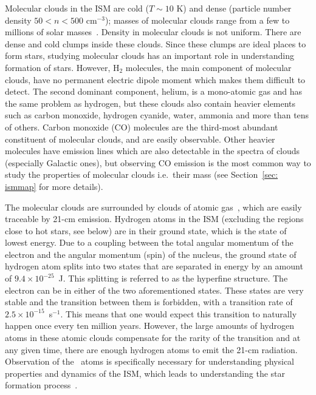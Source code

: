 Molecular clouds in the ISM are cold ($T \sim10$ K) and dense (particle number density $ 50<n<500$ cm$^{-3}$); masses of molecular clouds range from a few to millions of solar masses~\citep{Bolato08}.
Density in molecular clouds is not uniform. There are dense and cold clumps inside these clouds.
Since these clumps are ideal places to form stars, studying molecular clouds has an important role in understanding formation of stars.
However, H$_2$ molecules, the main component of molecular clouds, have no permanent electric dipole moment which makes them difficult to detect.
The second dominant component, helium, is a mono-atomic gas and has the same problem as hydrogen, but these clouds also contain heavier elements such as carbon monoxide, hydrogen cyanide, water, ammonia and more than tens of others.
Carbon monoxide (CO) molecules are the third-most abundant constituent of molecular clouds, and are easily observable.
Other heavier molecules have emission lines which are also detectable in the spectra of clouds (especially Galactic ones), but observing CO emission is the most common way to study the properties of molecular clouds i.e.\ their mass (see Section~\ref{sec: ismmap} for more details).

The molecular clouds are surrounded by clouds of atomic gas~\citep{Kennicutt12}, which are easily traceable by 21-cm emission.
Hydrogen atoms in the ISM (excluding the regions close to hot stars, see below) are in their ground state, which is the state of lowest energy.
Due to a coupling between the total angular momentum of the electron and the angular momentum (spin) of the nucleus, the ground state of hydrogen atom splits into two states that are separated in energy by an amount of $9.4\times 10^{-25}$~J.
This splitting is referred to as the hyperfine structure. 
The electron can be in either of the two aforementioned states. 
These states are very stable and the transition between them is forbidden, with a transition rate of $2.5\times10^{-15}$~s$^{-1}$.
This means that one would expect this transition to naturally happen once every ten million years.
However, the large amounts of hydrogen atoms in these atomic clouds compensate for the rarity of the transition and at any given time, there are enough hydrogen atoms to emit the 21-cm radiation. 
Observation of the \hi~atoms is specifically necessary for understanding physical properties and dynamics of the ISM, which leads to understanding the star formation process~\citep{Walter08}.

